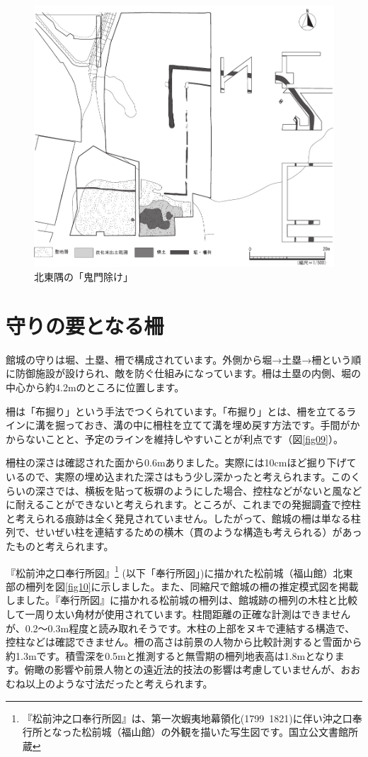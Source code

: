 \documentclass[11pt,report]{jsbook}
\begin{document}
\begin{figure}[h]
\centering
\includegraphics[width=160truemm]{fig/08.pdf}
\caption{北東隅の「鬼門除け」}
\label{fig08}
\end{figure}

\section{守りの要となる柵}
館城の守りは堀、土塁、柵で構成されています。外側から堀→土塁→柵という順に防御施設が設けられ、敵を防ぐ仕組みになっています。柵は土塁の内側、堀の中心から約4.2mのところに位置します。

柵は「布掘り」という手法でつくられています。「布掘り」とは、柵を立てるラインに溝を掘っておき、溝の中に柵柱を立てて溝を埋め戻す方法です。手間がかからないことと、予定のラインを維持しやすいことが利点です（図\ref{fig09}）。

柵柱の深さは確認された面から0.6mありました。実際には10cmほど掘り下げているので、実際の埋め込まれた深さはもう少し深かったと考えられます。このくらいの深さでは、横板を貼って板塀のようにした場合、控柱などがないと風などに耐えることができないと考えられます。ところが、これまでの発掘調査で控柱と考えられる痕跡は全く発見されていません。したがって、館城の柵は単なる柱列で、せいぜい柱を連結するための横木（貫のような構造も考えられる）があったものと考えられます。

『松前沖之口奉行所図』\footnote{
『松前沖之口奉行所図』は、第一次蝦夷地幕領化(1799~1821)に伴い沖之口奉行所となった松前城（福山館）の外観を描いた写生図です。国立公文書館所蔵
}
(以下「奉行所図」)に描かれた松前城（福山館）北東部の柵列を図\ref{fig10}に示しました。また、同縮尺で館城の柵の推定模式図を掲載しました。『奉行所図』に描かれる松前城の柵列は、館城跡の柵列の木柱と比較して一周り太い角材が使用されています。柱間距離の正確な計測はできませんが、0.2〜0.3m程度と読み取れそうです。木柱の上部をヌキで連結する構造で、控柱などは確認できません。柵の高さは前景の人物から比較計測すると雪面から約1.3mです。積雪深を0.5mと推測すると無雪期の柵列地表高は1.8mとなります。俯瞰の影響や前景人物との遠近法的技法の影響は考慮していませんが、おおむね以上のような寸法だったと考えられます。
\end{document}
